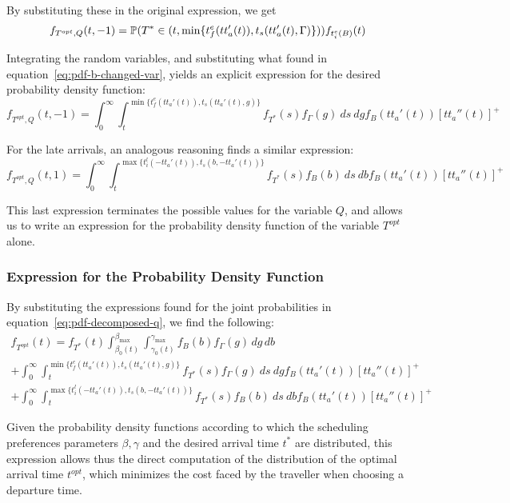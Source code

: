 By substituting these in the original expression, we get
\begin{equation}
  \label{eq:early-subst}
  f_{T^{opt}, Q}(t, -1) = \mathbb{P}(T^* \in (t, \min\{t_f^e(tt_a'(t)), t_s(tt_a'(t), \Gamma)\}))f_{t_i^e(B)}(t)
\end{equation}

Integrating the random variables,
and substituting what found in equation~\eqref{eq:pdf-b-changed-var},
yields an explicit expression for the desired probability density function:
\begin{equation}
  \label{eq:early-final}
  f_{T^{opt}, Q}(t, -1) = \int_0^\infty \int_t^{\min\{t_f^e(tt_a'(t)), t_s(tt_a'(t), g)\}}f_{T^*}(s) f_\Gamma(g)\ ds\ dg f_B(tt_a'(t)) [tt_a''(t)]^+
\end{equation}

For the late arrivals, an analogous reasoning finds a similar expression:
\begin{equation}
  \label{eq:late-final}
  f_{T^{opt}, Q}(t, 1) = \int_0^\infty \int_t^{\max\{t_i^l(-tt_a'(t)), t_s(b, -tt_a'(t))\}}f_{T^*}(s) f_B(b)\ ds\ db f_B(tt_a'(t)) [tt_a''(t)]^+
\end{equation}

This last expression terminates the possible values for the variable \(Q\),
and allows us to write an expression for the probability density function of the variable \(T^{opt}\) alone.

\subsubsection{Expression for the Probability Density Function}

By substituting the expressions found for the joint probabilities in equation~\eqref{eq:pdf-decomposed-q},
we find the following:
\begin{multline}
  \label{eq:pdf-final}
    f_{T^{opt}}(t) = f_{T^*}(t)\int_{\beta_0(t)}^{\beta_{\text{max}}}\int_{\gamma_0(t)}^{\gamma_{\text{max}}}f_B(b)f_\Gamma(g)\, dg\, db \\
    + \int_0^\infty \int_t^{\min\{t_f^e(tt_a'(t)), t_s(tt_a'(t), g)\}}f_{T^*}(s) f_\Gamma(g)\ ds\ dg f_B(tt_a'(t)) [tt_a''(t)]^+ \\
    + \int_0^\infty \int_t^{\max\{t_i^l(-tt_a'(t)), t_s(b, -tt_a'(t))\}}f_{T^*}(s) f_B(b)\ ds\ db f_B(tt_a'(t)) [tt_a''(t)]^+
\end{multline}

Given the probability density functions according to which the scheduling preferences parameters \(\beta, \gamma\) and the desired arrival time \(t^*\) are distributed,
this expression allows thus the direct computation of the distribution of the optimal arrival time \(t^{opt}\),
which minimizes the cost faced by the traveller when choosing a departure time.

